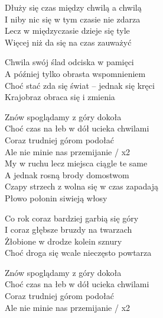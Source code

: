 \begin{text}
Dłuży się czas między chwilą a chwilą\\
I niby nic się w tym czasie nie zdarza\\
Lecz w międzyczasie dzieje się tyle\\
Więcej niż da się na czas zauważyć

Chwila swój ślad odciska w pamięci\\
A później tylko obrasta wspomnieniem\\
Choć stać zda się świat – jednak się kręci\\
Krajobraz obraca się i zmienia

Znów spoglądamy z góry dokoła\\
Choć czas na łeb w dół ucieka chwilami\\
Coraz trudniej górom podołać\\
Ale nie minie nas przemijanie / x2\\

My w ruchu lecz miejsca ciągle te same\\
A jednak rosną brody domostwom\\
Czapy strzech z wolna się w czas zapadają\\
Płowo połonin siwieją włosy

Co rok coraz bardziej garbią się góry\\
I coraz głębsze bruzdy na twarzach\\
Żłobione w drodze kolein sznury\\
Choć droga się wcale nieczęsto powtarza

Znów spoglądamy z góry dokoła\\
Choć czas na łeb w dół ucieka chwilami\\
Coraz trudniej górom podołać\\
Ale nie minie nas przemijanie / x2
\end{text}
\begin{chord}
\end{chord}